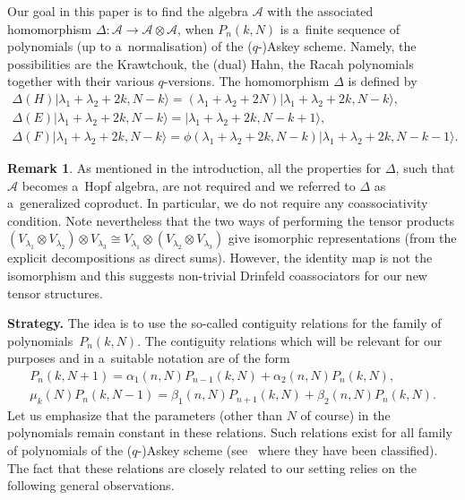 \documentclass[10pt,a4paper]{amsart}
\numberwithin{equation}{section}
\theoremstyle{definition}
\newtheorem{Remark}[Theorem]{Remark}
\begin{document}
Our goal in this paper is to find the algebra $\mathcal{A}$ with the associated homomorphism $\Delta\colon \mathcal{A}\to \mathcal{A}\otimes \mathcal{A}$, when $P_n(k,N)$ is a~finite sequence of polynomials (up to a~normalisation) of the ($q$-)Askey scheme.
 Namely, the possibilities are the Krawtchouk, the (dual) Hahn, the Racah polynomials together with their various $q$-versions.
The homomorphism $\Delta$ is defined by
\begin{gather*}
\Delta(H)|\lambda_1+\lambda_2+2k,N-k\rangle=(\lambda_1+\lambda_2+2N)|\lambda_1+\lambda_2+2k,N-k\rangle,\\
 \Delta(E)|\lambda_1+\lambda_2+2k,N-k\rangle=|\lambda_1+\lambda_2+2k,N-k+1\rangle,\\
 \Delta(F)|\lambda_1+\lambda_2+2k,N-k\rangle=\phi(\lambda_1+\lambda_2+2k,N-k)|\lambda_1+\lambda_2+2k,N-k-1\rangle.
\end{gather*}

\begin{Remark} \label{rem:iso}
As mentioned in the introduction, all the properties for $\Delta$, such that $\mathcal{A}$ becomes a~Hopf algebra, are not required and we referred to $\Delta$ as a~generalized coproduct. In particular, we do not require any coassociativity condition. Note nevertheless that the two ways of performing the tensor products
$(V_{\lambda_1}\otimes V_{\lambda_2})\otimes V_{\lambda_3}\cong V_{\lambda_1}\otimes(V_{\lambda_2}\otimes V_{\lambda_3})$
give isomorphic representations (from the explicit decompositions as direct sums). However, the identity map is not the isomorphism and this suggests non-trivial Drinfeld coassociators for our new tensor structures.
\end{Remark}

{\bf Strategy.} The idea is to use the so-called contiguity relations for the family of polynomials~$P_n(k,N)$. The contiguity relations which will be relevant for our purposes and in a~suitable notation are of the form
\begin{gather}\label{contiguity1}
P_n(k,N+1)=\alpha_1(n,N)P_{n-1}(k,N)+\alpha_2(n,N)P_n(k,N),\\
\label{contiguity2}
\mu_k(N)P_n(k,N-1)=\beta_1(n,N)P_{n+1}(k,N)+\beta_2(n,N) P_n(k,N).
\end{gather}
 Let us emphasize that the parameters (other than $N$ of course) in the polynomials remain constant in these relations. Such relations exist for all family of polynomials of the ($q$-)Askey scheme (see~\cite{contiguity} where they have been classified). The fact that these relations are closely related to our setting relies on the following general observations.
\end{document}
